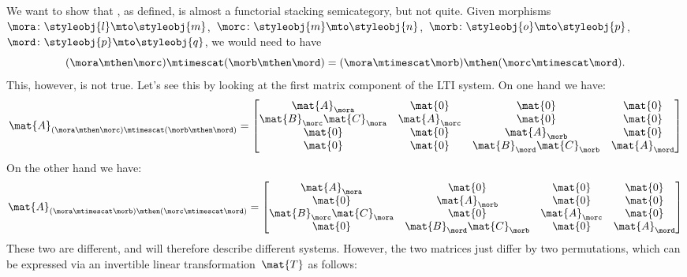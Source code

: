 \begin{example}
    We want to show that \LTI, as defined, is almost a functorial stacking semicategory, but not quite.
    Given morphisms~$\mora\colon \styleobj{l}\mto \styleobj{m}$,~$\morc\colon \styleobj{m}\mto \styleobj{n}$,~$\morb\colon \styleobj{o}\mto \styleobj{p}$,~$\mord\colon \styleobj{p}\mto \styleobj{q}$, we would need to have
    \begin{equation*}
        (\mora \mthen \morc)
        \mtimescat (\morb\mthen \mord)=(\mora\mtimescat \morb)\mthen (\morc\mtimescat \mord).
    \end{equation*}
    This, however, is not true.
    Let's see this by looking at the first matrix component of the LTI system.
    On one hand we have:
    \begin{equation*}
        \mat{A}_{(\mora \mthen \morc)\mtimescat (\morb\mthen \mord)}=
        \begin{bmatrix}
            \mat{A}_\mora              & \mat{0}       & \mat{0}                    & \mat{0}       \\
            \mat{B}_\morc\mat{C}_\mora & \mat{A}_\morc & \mat{0}                    & \mat{0}       \\
            \mat{0}                    & \mat{0}       & \mat{A}_\morb              & \mat{0}       \\
            \mat{0}                    & \mat{0}       & \mat{B}_\mord\mat{C}_\morb & \mat{A}_\mord
        \end{bmatrix}
    \end{equation*}
    On the other hand we have:
    \begin{equation*}
        \mat{A}_{(\mora\mtimescat \morb)\mthen (\morc\mtimescat \mord)}=
        \begin{bmatrix}
            \mat{A}_\mora               & \mat{0}                     & \mat{0}       & \mat{0}       \\
            \mat{0}                     & \mat{A}_\morb               & \mat{0}       & \mat{0}       \\
            \mat{B}_\morc \mat{C}_\mora & \mat{0}                     & \mat{A}_\morc & \mat{0}       \\
            \mat{0}                     & \mat{B}_\mord \mat{C}_\morb & \mat{0}       & \mat{A}_\mord
        \end{bmatrix}
    \end{equation*}
    These two are different, and will therefore describe different systems.
    However, the two matrices just differ by two permutations, which can be expressed via an invertible linear transformation~$\mat{T}$ as follows:

\end{example}
